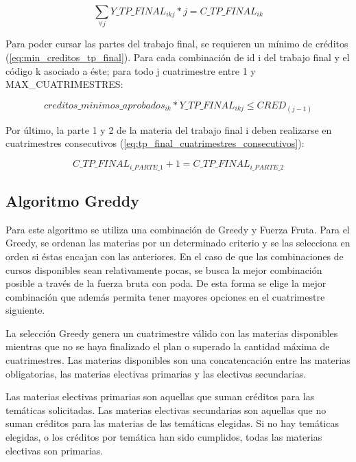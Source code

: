 \documentclass[a4paper]{article}
\begin{document}
\begin{equation}\label{eq:numero_cuatrimestre_tp_final}
\sum_{\forall j} Y\_TP\_FINAL_{ikj} * j = C\_TP\_FINAL_{ik}
\end{equation}

Para poder cursar las partes del trabajo final, se requieren un mínimo de créditos (\ref{eq:min_creditos_tp_final}). Para cada combinación de id i del trabajo final y el código k asociado a éste; para todo j cuatrimestre entre 1 y MAX\_CUATRIMESTRES:

\begin{equation}\label{eq:min_creditos_tp_final}
creditos\_minimos\_aprobados_{ik} * Y\_TP\_FINAL_{ikj} \leq CRED_{(j-1)}
\end{equation}

Por último, la parte 1 y 2 de la materia del trabajo final i deben realizarse en cuatrimestres consecutivos (\ref{eq:tp_final_cuatrimestres_consecutivos}):

\begin{equation}\label{eq:tp_final_cuatrimestres_consecutivos}
C\_TP\_FINAL_{i\_PARTE\_1} + 1 = C\_TP\_FINAL_{i\_PARTE\_2}
\end{equation}


\subsection{Algoritmo Greddy}

Para este algoritmo se utiliza una combinación de Greedy y Fuerza Fruta. Para el Greedy, se ordenan las materias por un determinado criterio y se las selecciona en orden si éstas encajan con las anteriores. En el caso de que las combinaciones de cursos disponibles sean relativamente pocas, se busca la mejor combinación posible a través de la fuerza bruta con poda. De esta forma se elige la mejor combinación que además permita tener mayores opciones en el cuatrimestre siguiente.\newline

La selección Greedy genera un cuatrimestre válido con las materias disponibles mientras que no se haya finalizado el plan o superado la cantidad máxima de cuatrimestres. Las materias disponibles son una concatencación entre las materias obligatorias, las materias electivas primarias y las electivas secundarias.

Las materias electivas primarias son aquellas que suman créditos para las temáticas solicitadas. Las materias electivas secundarias son aquellas que no suman créditos para las materias de las temáticas elegidas. Si no hay temáticas elegidas, o los créditos por temática han sido cumplidos, todas las materias electivas son primarias.\newline
\end{document}
